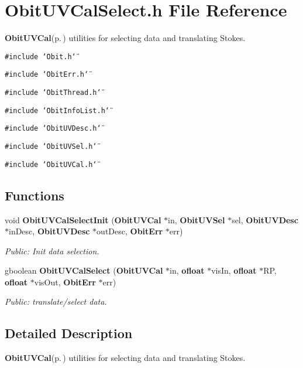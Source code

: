 \section{Obit\-UVCal\-Select.h File Reference}
\label{ObitUVCalSelect_8h}
{\bf Obit\-UVCal}{\rm (p.\,\pageref{structObitUVCal})} utilities for selecting data and translating Stokes. 

{\tt \#include \char`\"{}Obit.h\char`\"{}}\par
{\tt \#include \char`\"{}Obit\-Err.h\char`\"{}}\par
{\tt \#include \char`\"{}Obit\-Thread.h\char`\"{}}\par
{\tt \#include \char`\"{}Obit\-Info\-List.h\char`\"{}}\par
{\tt \#include \char`\"{}Obit\-UVDesc.h\char`\"{}}\par
{\tt \#include \char`\"{}Obit\-UVSel.h\char`\"{}}\par
{\tt \#include \char`\"{}Obit\-UVCal.h\char`\"{}}\par
\subsection*{Functions}
\begin{CompactItemize}
\item 
void {\bf Obit\-UVCal\-Select\-Init} ({\bf Obit\-UVCal} $\ast$in, {\bf Obit\-UVSel} $\ast$sel, {\bf Obit\-UVDesc} $\ast$in\-Desc, {\bf Obit\-UVDesc} $\ast$out\-Desc, {\bf Obit\-Err} $\ast$err)
\begin{CompactList}\small\item\em Public: Init data selection. \item\end{CompactList}\item 
gboolean {\bf Obit\-UVCal\-Select} ({\bf Obit\-UVCal} $\ast$in, {\bf ofloat} $\ast$vis\-In, {\bf ofloat} $\ast$RP, {\bf ofloat} $\ast$vis\-Out, {\bf Obit\-Err} $\ast$err)
\begin{CompactList}\small\item\em Public: translate/select data. \item\end{CompactList}\end{CompactItemize}


\subsection{Detailed Description}
{\bf Obit\-UVCal}{\rm (p.\,\pageref{structObitUVCal})} utilities for selecting data and translating Stokes. 

